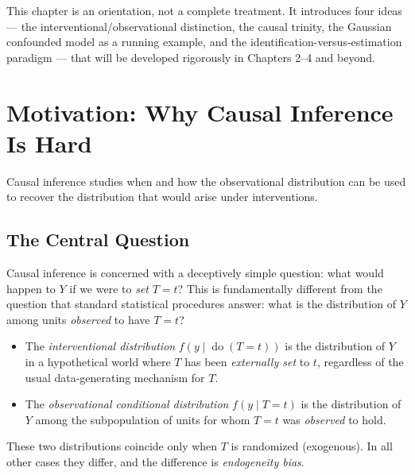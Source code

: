 \documentclass[
  a4paper,
]{book}
\providecommand{\tightlist}{%
  \setlength{\itemsep}{0pt}\setlength{\parskip}{0pt}}
\newcommand{\doop}{\operatorname{do}}
\begin{document}
This chapter is an orientation, not a complete treatment. It introduces
four ideas --- the interventional/observational distinction, the causal
trinity, the Gaussian confounded model as a running example, and the
identification-versus-estimation paradigm --- that will be developed
rigorously in Chapters 2--4 and beyond.

\section{Motivation: Why Causal Inference Is
Hard}\label{motivation-why-causal-inference-is-hard}

Causal inference studies when and how the observational distribution can
be used to recover the distribution that would arise under
interventions.

\subsection{The Central Question}\label{the-central-question}

Causal inference is concerned with a deceptively simple question: what
would happen to \(Y\) if we were to \emph{set} \(T = t\)? This is
fundamentally different from the question that standard statistical
procedures answer: what is the distribution of \(Y\) among units
\emph{observed} to have \(T = t\)?

\begin{tcolorbox}[enhanced jigsaw, arc=.35mm, bottomrule=.15mm, bottomtitle=1mm, breakable, colback=white, colbacktitle=quarto-callout-note-color!10!white, colframe=quarto-callout-note-color-frame, coltitle=black, left=2mm, leftrule=.75mm, opacityback=0, opacitybacktitle=0.6, rightrule=.15mm, title={Definition: Interventional vs.~Observational Distribution}, titlerule=0mm, toprule=.15mm, toptitle=1mm]

\begin{itemize}
\tightlist
\item
  The \emph{interventional distribution} \(f(y \mid \doop(T{=}t))\) is
  the distribution of \(Y\) in a hypothetical world where \(T\) has been
  \emph{externally set} to \(t\), regardless of the usual
  data-generating mechanism for \(T\).
\item
  The \emph{observational conditional distribution} \(f(y \mid T{=}t)\)
  is the distribution of \(Y\) among the subpopulation of units for whom
  \(T = t\) was \emph{observed} to hold.
\end{itemize}

These two distributions coincide only when \(T\) is randomized
(exogenous). In all other cases they differ, and the difference is
\emph{endogeneity bias}.

\end{tcolorbox}
\end{document}
